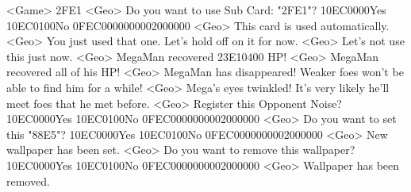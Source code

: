 <Game> {2F}{E1}
<Geo> Do you want to use Sub Card: "{2F}{E1}"? {10}{EC}{00}{00}Yes {10}{EC}{01}{00}No {0F}{EC}{00}{00}{00}{00}{02}{00}{00}{00}
<Geo> This card is used automatically.
<Geo> You just used that one. Let's hold off on it for now.
<Geo> Let's not use this just now.
<Geo> MegaMan recovered {23}{E1}{04}{00} HP! 
<Geo> MegaMan recovered all of his HP! 
<Geo> MegaMan has disappeared! Weaker foes won't be able to find him for a while! 
<Geo> Mega's eyes twinkled! It's very likely he'll meet foes that he met before. 
<Geo> Register this Opponent Noise? {10}{EC}{00}{00}Yes {10}{EC}{01}{00}No {0F}{EC}{00}{00}{00}{00}{02}{00}{00}{00}
<Geo> Do you want to set this "{88}{E5}"? {10}{EC}{00}{00}Yes {10}{EC}{01}{00}No {0F}{EC}{00}{00}{00}{00}{02}{00}{00}{00}
<Geo> New wallpaper has been set. 
<Geo> Do you want to remove this wallpaper? {10}{EC}{00}{00}Yes {10}{EC}{01}{00}No {0F}{EC}{00}{00}{00}{00}{02}{00}{00}{00}
<Geo> Wallpaper has been removed. 
